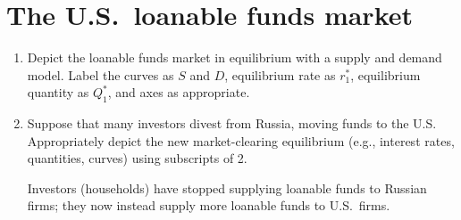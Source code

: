 \documentclass[
    letterpaper,paper=portrait,fleqn,
    DIV=16,fontsize=12pt,twoside=semi,
    parskip=full-,
    headings=standardclasses]
{scrartcl}
\begin{document}
\section{The U.S.~loanable funds market}

\begin{enumerate}

\item Depict the loanable funds market in equilibrium with a supply and demand model. Label the curves as $S$ and $D$, equilibrium rate as $r^*_1$, equilibrium quantity as $Q^*_1$, and axes as appropriate.

\begin{solution}
\begin{center}
\end{center}
\vspace{-12pt}
\end{solution}

\item Suppose that many investors divest from Russia, moving funds to the U.S. Appropriately depict the new market-clearing equilibrium (e.g., interest rates, quantities, curves) using subscripts of 2.

\begin{solution}
Investors (households) have stopped supplying loanable funds to Russian firms; they now instead supply more loanable funds to U.S.~firms.

\begin{center}
\end{center}
\end{solution}


\end{enumerate}
\end{document}
